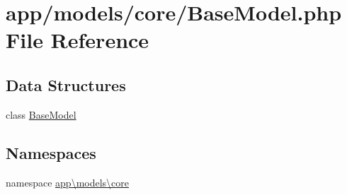 \hypertarget{_base_model_8php}{\section{app/models/core/\-Base\-Model.php File Reference}
\label{_base_model_8php}
}
\subsection*{Data Structures}
\begin{DoxyCompactItemize}
\item 
class \hyperlink{classapp_1_1models_1_1core_1_1_base_model}{Base\-Model}
\end{DoxyCompactItemize}
\subsection*{Namespaces}
\begin{DoxyCompactItemize}
\item 
namespace \hyperlink{namespaceapp_1_1models_1_1core}{app\textbackslash{}models\textbackslash{}core}
\end{DoxyCompactItemize}
